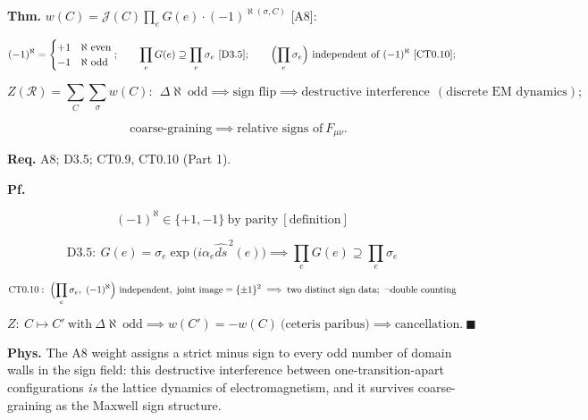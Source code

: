 \begin{theorem}\label{tag:EM-13}
\textbf{Thm.} $w(C)=\mathcal J(C)\prod_{e}G(e)\cdot(-1)^{\aleph(\sigma,C)}$ [A8]:

\[
(-1)^{\aleph}=\begin{cases}+1&\aleph\ \text{even}\\ -1&\aleph\ \text{odd}\end{cases};\qquad
\prod_eG(e)\supseteq\prod_e\sigma_e\ [\mathrm{D3.5}];\qquad
\Bigl(\prod_e\sigma_e\Bigr)\ \text{independent of}\ (-1)^{\aleph}\ [\mathrm{CT0.10}];
\]

\[
Z(\mathcal R)=\sum_C\sum_\sigma w(C):\ \ \Delta\aleph\ \text{odd}\implies\text{sign flip}\implies\text{destructive interference}\ \ (\text{discrete EM dynamics});
\]

\[
\quad \text{coarse-graining}\implies\text{relative signs of}\ F_{\mu\nu}.
\]

\textbf{Req.} A8; D3.5; CT0.9, CT0.10 (Part 1).

\textbf{Pf.}

\[
(-1)^{\aleph}\in\{+1,-1\}\ \text{by parity}\ [\text{definition}]
\]

\[
\mathrm{D3.5}:\ G(e)=\sigma_e\exp\bigl(i\alpha_e\widehat{ds}^{\,2}(e)\bigr)\implies\prod_eG(e)\supseteq\prod_e\sigma_e
\]

\[
\mathrm{CT0.10}:\ \Bigl(\prod_e\sigma_e,\ (-1)^{\aleph}\Bigr)\ \text{independent},\ \text{joint image}=\{\pm1\}^2\implies\text{two distinct sign data};\ \neg\text{double counting}
\]

\[
Z:\ C\mapsto C'\ \text{with}\ \Delta\aleph\ \text{odd}\implies w(C')=-w(C)\ \text{(ceteris paribus)}\implies\text{cancellation}.\ \blacksquare
\]

\textbf{Phys.} The A8 weight assigns a strict minus sign to every odd number of domain walls in the sign field: this destructive interference between one-transition-apart configurations \textit{is} the lattice dynamics of electromagnetism, and it survives coarse-graining as the Maxwell sign structure.

\end{theorem}

